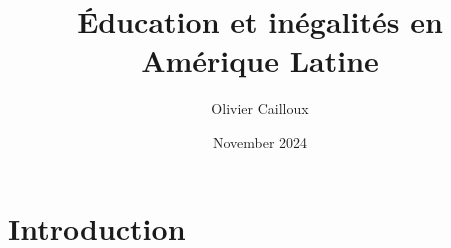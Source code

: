 \documentclass{article}
\title{Éducation et inégalités en Amérique Latine}
\author{Olivier Cailloux}
\date{November 2024}
\begin{document}
\maketitle

\section{Introduction}
\end{document}
